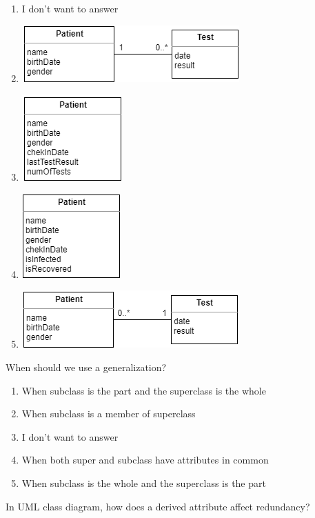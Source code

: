 \documentclass{bdad}
\begin{document}
\begin{enumerate}
    \item I don't want to answer
    \item \includegraphics[scale=0.8]{2020T-03b.png}
    \item \includegraphics[scale=0.8]{2020T-03c.png}
    \item \includegraphics[scale=0.8]{2020T-03d.png}
    \item \includegraphics[scale=0.8]{2020T-03e.png}
\end{enumerate}

When should we use a generalization?

\begin{enumerate}
    \item When subclass is the part and the superclass is the whole
    \item When subclass is a member of superclass
    \item I don't want to answer
    \item When both super and subclass have attributes in common
    \item When subclass is the whole and the superclass is the part
\end{enumerate}

In UML class diagram, how does a derived attribute affect redundancy?
\end{document}
